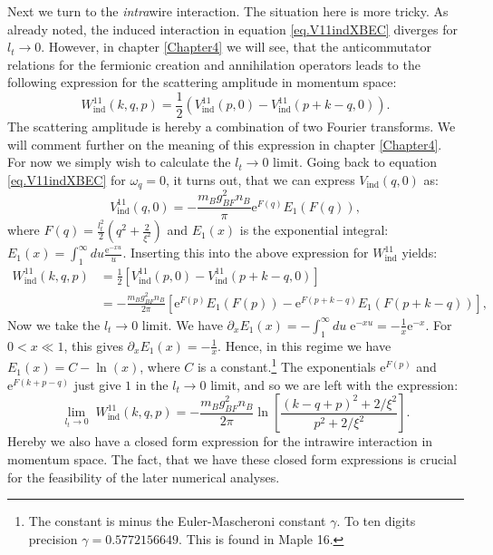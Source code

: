 Next we turn to the \textit{intra}wire interaction. The situation here is more tricky. As already noted, the induced interaction in equation \eqref{eq.V11indXBEC} diverges for $l_t \to 0$. However, in chapter \ref{Chapter4} we will see, that the anticommutator relations for the fermionic creation and annihilation operators leads to the following expression for the scattering amplitude in momentum space:
\begin{equation}
W^{11}_{\text{ind}}(k, q, p) = \frac{1}{2}\left(V^{11}_{\text{ind}}\left( p, 0 \right) - V^{11}_\text{ind}\left( p + k - q, 0 \right) \right). 
\label{eq.Wkqp.scattering.amplitude}
\end{equation}
The scattering amplitude is hereby a combination of two Fourier transforms. We will comment further on the meaning of this expression in chapter \ref{Chapter4}. For now we simply wish to calculate the $l_t \to 0$ limit. Going back to equation \eqref{eq.V11indXBEC} for $\omega_q = 0$, it turns out, that we can express $V_\text{ind}\left( q, 0 \right)$ as:
\begin{equation}
V^{11}_{\text{ind}}(q, 0) = -\frac{m_Bg_{BF}^2n_B}{\pi} \text{e}^{F(q)} E_1(F(q)),
\label{eq.V11indq.zerofrequency.ltnonzero}
\end{equation}
where $F(q) = \frac{l_t^2}{2}\left(q^2 + \frac{2}{\xi^2} \right)$ and $E_1(x)$ is the exponential integral: $E_1(x) = \int_1^\infty du \frac{\text{e}^{-xu}}{u}$. Inserting this into the above expression for $W^{11}_{\text{ind}}$ yields:
\begin{align}
W^{11}_{\text{ind}}(k, q, p) &= \frac{1}{2}\left[V^{11}_\text{ind}(p, 0) - V^{11}_\text{ind}(p + k - q, 0)\right] \nonumber \\
&= -\frac{m_Bg_{BF}^2n_B}{2\pi}\left[ \text{e}^{F(p)} E_1(F(p)) - \text{e}^{F(p + k - q)} E_1(F(p + k - q)) \right], \nonumber
\end{align}
Now we take the $l_t \to 0$ limit. We have $\partial_x E_1(x) = -\int_1^{\infty}du\; \text{e}^{-xu} = -\frac{1}{x}\text{e}^{-x}$. For $0 < x \ll 1$, this gives $\partial_xE_1(x) = -\frac{1}{x}$. Hence, in this regime we have $E_1(x) = C -\ln(x)$, where $C$ is a constant.\footnote{The constant is minus the Euler-Mascheroni constant $\gamma$. To ten digits precision $\gamma = 0.5772156649$. This is found in Maple 16.} The exponentials $\text{e}^{F(p)}$ and $\text{e}^{F(k + p - q)}$ just give $1$ in the $l_t \to 0$ limit, and so we are left with the expression:
\begin{equation}
\lim_{l_t \to 0} \; W^{11}_{\text{ind}}(k, q, p) = -\frac{m_Bg_{BF}^2n_B}{2\pi} \ln\left[\frac{(k - q + p)^2 + 2/\xi^2}{p^2 + 2/\xi^2}\right].
\label{eq.Wkqp.scattering.amplitude.lt=0} 
\end{equation}
Hereby we also have a closed form expression for the intrawire interaction in momentum space. The fact, that we have these closed form expressions is crucial for the feasibility of the later numerical analyses.




